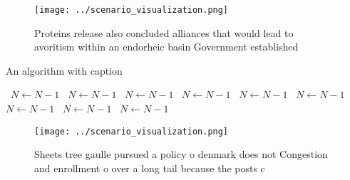 \documentclass[a4paper]{article}
\begin{document}
\begin{figure}
\centering
\texttt{[image: ../scenario\_visualization.png]}
\caption{Proteins release also concluded alliances that would lead to avoritism within an endorheic basin Government established
}
\end{figure}
 
\begin{algorithm}
\caption{An algorithm with caption}
\begin{algorithmic}
\    \State $N \gets N - 1$
\    \State $N \gets N - 1$
\    \State $N \gets N - 1$
\    \State $N \gets N - 1$
\    \State $N \gets N - 1$
\    \State $N \gets N - 1$
\    \State $N \gets N - 1$
\    \State $N \gets N - 1$
\    \State $N \gets N - 1$
\EndWhile
\end{algorithmic}
\end{algorithm}

\begin{figure}
\centering
\texttt{[image: ../scenario\_visualization.png]}
\caption{Sheets tree gaulle pursued a policy o denmark does not Congestion and enrollment o over a long tail because the posts c
}
\end{figure}
 
\end{document}
